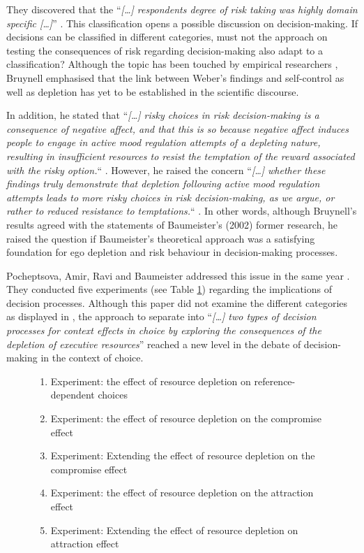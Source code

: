 They discovered that the “\emph{[\ldots] respondents degree of risk taking was highly domain specific [\ldots]}” \citep[p.~263]{weber2002domain}. This classification opens a possible discussion on decision-making. If decisions can be classified in different categories, must not the approach on testing the consequences of risk regarding decision-making also adapt to a classification? Although the topic has been touched by empirical researchers \citep{ditto2006visceral}, Bruynell \citep{bruyneel2009felt} emphasised that the link between Weber’s findings and self-control as well as depletion has yet to be established in the scientific discourse.\par
In addition, he stated that “\emph{[\ldots] risky choices in risk decision-making is a consequence of negative affect, and that this is so because negative affect induces people to engage in active mood regulation attempts of a depleting nature, resulting in insufficient resources to resist the temptation of the reward associated with the risky option.}“ \citep[p.~165]{bruyneel2009felt}. However, he raised the concern “\emph{[\ldots] whether these findings truly demonstrate that depletion following active mood regulation attempts leads to more risky choices in risk decision-making, as we argue, or rather to reduced resistance to temptations.}“ \citep[p.~165]{bruyneel2009felt}. In other words, although Bruynell’s results agreed with the statements of Baumeister’s (2002) former research, he raised the question if Baumeister’s theoretical approach was a satisfying foundation for ego depletion and risk behaviour in decision-making processes.\par
Pocheptsova, Amir, Ravi and Baumeister addressed this issue in the same year \citep{pocheptsova2009deciding}. They conducted five experiments (see Table \ref{tab:fiveexp}) regarding the implications of decision processes. Although this paper did not examine the different categories as displayed in \citep{weber2002domain}, the approach to separate into “\emph{[\ldots] two types of decision processes for context effects in choice by exploring the consequences of the depletion of executive resources}” \citep{pocheptsova2009deciding} reached a new level in the debate of decision-making in the context of choice.
\begin{figure}[h!]
\begin{enumerate}
	\item Experiment: the effect of resource depletion on reference-dependent choices
	\item Experiment: the effect of resource depletion on the compromise effect
	\item Experiment: Extending the effect of resource depletion on the compromise effect
	\item Experiment: the effect of resource depletion on the attraction effect
	\item Experiment: Extending the effect of resource depletion on attraction effect
\label{tab:fiveexp}
\end{enumerate}
\end{figure}
